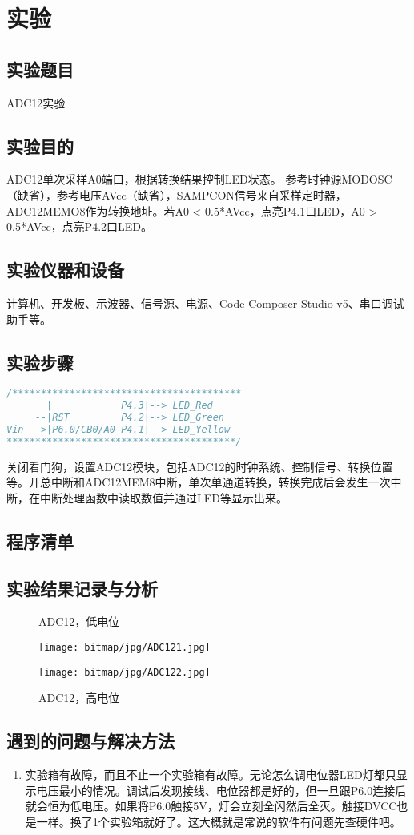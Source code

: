 ﻿%
\section{实验}
\subsection{实验题目}
ADC12实验
\subsection{实验目的}
ADC12单次采样A0端口，根据转换结果控制LED状态。
参考时钟源MODOSC（缺省），参考电压AVcc（缺省），SAMPCON信号来自采样定时器，ADC12MEMO8作为转换地址。若A0 < 0.5*AVcc，点亮P4.1口LED，A0 > 0.5*AVcc，点亮P4.2口LED。
\subsection{实验仪器和设备}计算机、开发板、示波器、信号源、电源、Code Composer Studio v5、串口调试助手等。
\subsection{实验步骤}
\begin{lstlisting}[language=C]
/****************************************
       |            P4.3|--> LED_Red
     --|RST         P4.2|--> LED_Green
Vin -->|P6.0/CB0/A0 P4.1|--> LED_Yellow
****************************************/
\end{lstlisting}
\par\indent 关闭看门狗，设置ADC12模块，包括ADC12的时钟系统、控制信号、转换位置等。开总中断和ADC12MEM8中断，单次单通道转换，转换完成后会发生一次中断，在中断处理函数中读取数值并通过LED等显示出来。
\subsection{程序清单}

\subsection{实验结果记录与分析}
\begin{figure}[htbp]
	\centering
	\begin{minipage}[htbp]{7.5cm}
		\centering
		\caption{ADC12，低电位}
		\label{ADC121}
		\texttt{[image: bitmap/jpg/ADC121.jpg]}
	\end{minipage}
	\begin{minipage}[htbp]{7.5cm}
		\centering
		\caption{ADC12，高电位}
		\label{ADC122}
		\texttt{[image: bitmap/jpg/ADC122.jpg]}
	\end{minipage}
\end{figure}
\subsection{遇到的问题与解决方法}
\begin{enumerate}
	\item 实验箱有故障，而且不止一个实验箱有故障。无论怎么调电位器LED灯都只显示电压最小的情况。调试后发现接线、电位器都是好的，但一旦跟P6.0连接后就会恒为低电压。如果将P6.0触接5V，灯会立刻全闪然后全灭。触接DVCC也是一样。换了1个实验箱就好了。这大概就是常说的软件有问题先查硬件吧。
\end{enumerate}
